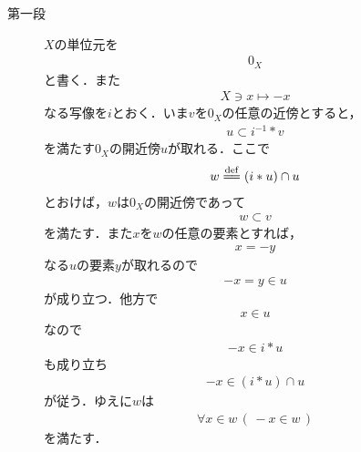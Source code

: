 	\begin{sketch}\mbox{}
		\begin{description}
			\item[第一段] 
				$X$の単位元を
				\begin{align}
					0_X
				\end{align}
				と書く．また
				\begin{align}
					X \ni x \longmapsto -x
				\end{align}
				なる写像を$i$とおく．いま$v$を$0_X$の任意の近傍とすると，
				\begin{align}
					u \subset i^{-1} \ast v
				\end{align}
				を満たす$0_X$の開近傍$u$が取れる．ここで
				\begin{align}
					w \defeq (i \ast u) \cap u
				\end{align}
				とおけば，$w$は$0_X$の開近傍であって
				\begin{align}
					w \subset v
				\end{align}
				を満たす．また$x$を$w$の任意の要素とすれば，
				\begin{align}
					x = -y
				\end{align}
				なる$u$の要素$y$が取れるので
				\begin{align}
					-x = y \in u
				\end{align}
				が成り立つ．他方で
				\begin{align}
					x \in u
				\end{align}
				なので
				\begin{align}
					-x \in i \ast u
				\end{align}
				も成り立ち
				\begin{align}
					-x \in (i \ast u) \cap u
				\end{align}
				が従う．ゆえに$w$は
				\begin{align}
					\forall x \in w\, (\, -x \in w\, )
				\end{align}
				を満たす．
				

\end{description}
\end{sketch}
